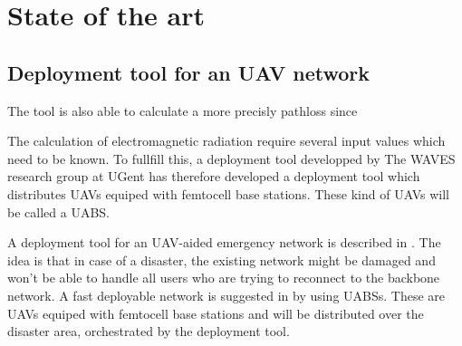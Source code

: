 \chapter{State of the art}
\label{chap:stateoftheart}

\section{Deployment tool for an UAV network}
\label{sec:stateoftheart:deploymenttool}

The tool is also able to calculate a more precisly pathloss since 


The calculation of electromagnetic radiation require several input values which need to be known. To fullfill this, a deployment tool developped by
The WAVES research group at UGent has therefore developed a deployment tool which distributes UAVs equiped with femtocell base stations. These kind of UAVs will be called 
a \gls{UABS}. 

A deployment tool for an UAV-aided emergency network is described in \cite{J2}. The idea is that in case of a disaster, the existing network might be damaged and won't be able 
to handle all users who are trying to reconnect to the backbone network. A fast deployable network is suggested in \cite{J2} by using \gls{UABS}s. These are UAVs equiped with femtocell base stations
and will be distributed over the disaster area, orchestrated by the deployment tool. 


